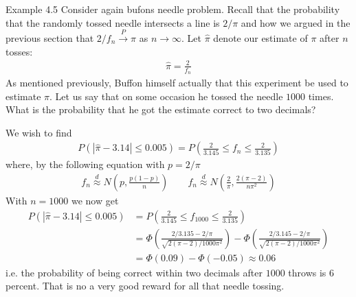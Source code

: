 \begin{boks}{Example 4.5}
  Consider again bufons needle problem. Recall that the probability that the randomly tossed needle intersects a line is $2/\pi$ and how we argued in the previous section that $2/f_n \xrightarrow{P} \pi$ as $ n \rightarrow \infty$. Let $\hat{\pi}$ denote our estimate of $\pi$ after $n$ tosses:
  \begin{align*}
    \hat{\pi} = \frac{2}{f_n}
  \end{align*}
  As mentioned previously, Buffon himself actually that this experiment be used to estimate $\pi$. Let us say that on some occasion he tossed the needle $1000$ times. What is the probability that he got the estimate correct to two decimals?

  We wish to find
  \begin{align*}
    P(|\hat{\pi} - 3.14| \leq 0.005) = P\left( \frac{2}{3.145} \leq f_n \leq \frac{2}{3.135} \right)
  \end{align*}
  where, by the following equation with $p=2/\pi$
  \begin{align*}
    f_n \stackrel{d}{\approx} N\left( p, \frac{p(1 - p)}{n} \right) \qquad
    f_n \stackrel{d}{\approx} N\left( \frac{2}{\pi}, \frac{2(\pi - 2)}{n\pi^2} \right)
  \end{align*}
  With $n = 1000$ we now get
  \begin{align*}
    P(|\hat{\pi} - 3.14| \leq 0.005) &= P \left( \frac{2}{3.145} \leq f_{1000} \leq \frac{2}{3.135} \right)\\
    &=\Phi \left( \frac{2/3.135 - 2/\pi}{\sqrt{2(\pi - 2)/1000\pi^2}} \right) - \Phi\left( \frac{2/3.145 - 2/\pi}{\sqrt{2(\pi - 2)/1000\pi^2}} \right)\\
    &= \Phi(0.09) - \Phi(-0.05) \approx 0.06
  \end{align*}
  i.e. the probability of being correct within two decimals after $1000$ throws is 6 percent. That is no a very good reward for all that needle tossing.
\end{boks}

